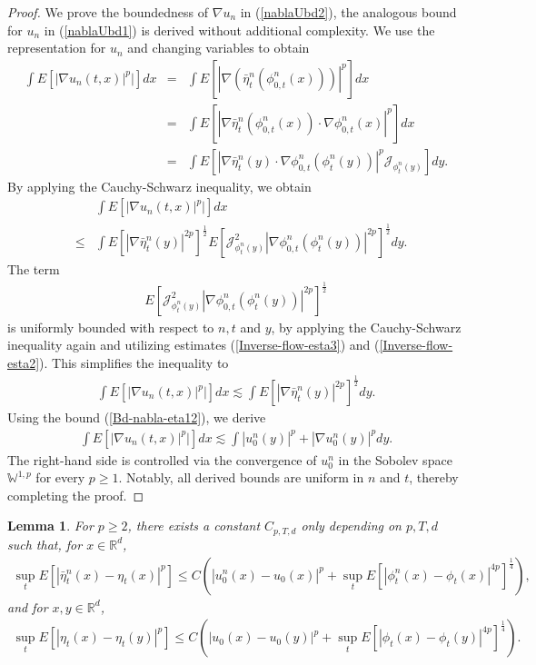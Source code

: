 \documentclass[12pt,oneside, reqno]{amsart}
\newcommand{\be}{\begin{eqnarray}}
\newcommand{\ee}{\end{eqnarray}}
\newcommand{\ce}{\begin{eqnarray*}}
\newcommand{\de}{\end{eqnarray*}}
\newtheorem{lemma}[theorem]{Lemma}
\def\cJ{{\mathcal J}}
\def\mR{{\mathbb R}}
\def\mW{{\mathbb W}}
\def\geq{\geqslant}
\def\leq{\leqslant}
\numberwithin{equation}{section}
\begin{document}
\begin{proof}
 We prove the boundedness of $ \nabla u_n $ in (\ref{nablaUbd2}), the analogous bound for $ u_n $ in (\ref{nablaUbd1}) is derived without additional complexity. We use the representation for $u_n$ and changing variables to obtain 
	\ce 
	\int E\left[|\nabla u_n(t,x)|^p|\right]dx
	&=& \int E\left[|\nabla (\bar\eta_t^n(\phi_{0,t}^n(x)))|^{p}\right]dx\\
	&= &\int E\left[|\nabla \bar\eta_t^n(\phi_{0,t}^n(x))\cdot \nabla \phi_{0,t}^n(x)|^{p}\right]dx\\
	&= &\int E\left[|\nabla \bar\eta_t^n(y)\cdot \nabla \phi_{0,t}^n(\phi_{t}^n(y))|^{p}\cJ_{\phi_t^n(y)}\right]dy.
	\de 
	By applying the Cauchy-Schwarz inequality, we obtain
	\ce 
	&&\int E\left[|\nabla u_n(t,x)|^p|\right]dx\\
	&\leq &\int E\left[|\nabla \bar\eta_t^n(y)|^{2p}\right]^{\frac{1}{2}}E\left[\cJ_{\phi_t^n(y)}^2|\nabla \phi_{0,t}^n(\phi_{t}^n(y))|^{2p}\right]^{\frac{1}{2}}dy.
	\de 
The term
	\ce 
	E\left[\cJ_{\phi_t^n(y)}^2|\nabla \phi_{0,t}^n(\phi_{t}^n(y))|^{2p}\right]^{\frac{1}{2}}
	\de 
is uniformly bounded with respect to 	$n,t$ and $y$, by applying the Cauchy-Schwarz inequality again and utilizing estimates (\ref{Inverse-flow-esta3}) and (\ref{Inverse-flow-esta2}). This simplifies the inequality to
		\ce 
	\int E\left[|\nabla u_n(t,x)|^p|\right]dx
	\lesssim \int E\left[|\nabla \bar\eta_t^n(y)|^{2p}\right]^{\frac{1}{2}}dy.
	\de 
Using the bound (\ref{Bd-nabla-eta12}), we derive
	\ce
	\int E\left[|\nabla u_n(t,x)|^p|\right]dx\lesssim \int |u_0^n(y)|^{p}+|\nabla u_0^n(y)|^{p}dy. 
	\de 
The right-hand side is controlled via the convergence of  $u_0^n$ in the Sobolev space $\mW^{1,p}$ for every $p\geq 1$. Notably, all derived bounds are uniform in $n$ and $t$, thereby completing the proof.
\end{proof}
\begin{lemma}
	For $p\geq 2$, there exists a constant $C_{p,T,d}$ only depending on $p,T,d$ such that, for $x\in\mR^d$, 
	\be \label{convergence-etan-to-eta1}
	\sup_t E[|\bar\eta_t^n(x)-\eta_t(x)|^p]\leq C \left(|u_0^n(x)-u_0(x)|^p+\sup_t E[|\phi_{t}^n(x)-\phi_{t}(x)|^{4p}]^{\frac{1}{4}}\right),
	\ee 
	and for $x,y\in\mR^d$, 
		\be \label{difference-eta-x-y2}
	\sup_t E[|\eta_t(x)-\eta_t(y)|^p]\leq C \left(|u_0(x)-u_0(y)|^p+ \sup_t E\left[|\phi_{t}(x)-\phi_{t}(y)|^{4p}\right]^{\frac{1}{4}}\right).
	\ee 
\end{lemma}
\end{document}
